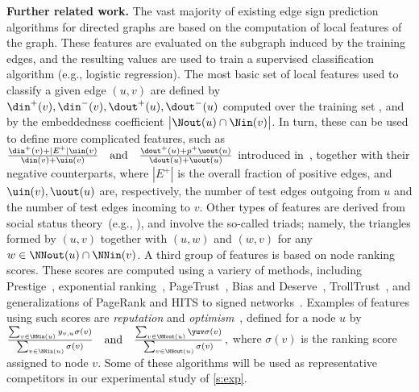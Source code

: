 \label{ssec:further_related}
{\bf Further related work.} The vast majority of existing edge sign prediction algorithms for
directed graphs are based on the computation of local features of the graph. These features are
evaluated on the subgraph induced by the training edges, and the resulting values are used to train
a supervised classification algorithm (e.g., logistic regression). The most basic set of local
features used to classify a given edge $(u,v)$ are defined by
$\din^+(v),\din^-(v),\dout^+(u),\dout^-(u)$ computed over the training set \trainset{}, and by the
embeddedness coefficient $\big|\Nout(u) \cap \Nin(v)\big|$. In turn, these can be used to define
more complicated features, such as
\(
	\frac{\din^+(v) + |E^+|\uin(v)}{\din(v) + \uin(v)}
\quad\text{and}\quad
	\frac{\dout^+(u) + p^+\uout(u)}{\dout(u) + \uout(u)}
\)
introduced in~\autocite{Bayesian15}, together with their negative counterparts, where $|E^+|$ is the
overall fraction of positive edges, and $\uin(v),\uout(u)$ are, respectively, the number of test
edges outgoing from $u$ and the number of test edges incoming to $v$.
Other types of features are derived from social status theory~(e.g., \autocite{Leskovec2010}), and
involve the so-called triads; namely, the triangles formed by $(u,v)$ together with $(u,w)$ and
$(w,v)$ for any $w \in \NNout(u) \cap \NNin(v)$. A third group of features is based on node ranking
scores. These scores are computed using a variery of methods, including
Prestige~\autocite{zolfaghar2010mining}, exponential ranking~\autocite{traag2010exponential},
PageTrust~\autocite{de2008pagetrust}, Bias and Deserve~\autocite{mishra2011finding},
TrollTrust~\autocite{wu2016troll}, and generalizations of PageRank and HITS to signed
networks~\autocite{shahriari2014ranking}. Examples of features using such scores are \textsl{reputation}
and \textsl{optimism}~\autocite{shahriari2014ranking}, defined for a node $u$ by
\(
	\frac{\sum_{v \in \NNin(u)} y_{v,u}\sigma(v)}{\sum_{v \in \NNin(u)} \sigma(v)}
\quad\text{and}\quad
	\frac{\sum_{v \in \NNout(u)} \yuv\sigma(v)}{\sum_{v \in \NNout(u)} \sigma(v)}\,,
\)
where $\sigma(v)$ is the ranking score assigned to node $v$. Some of these algorithms will be used
as representative competitors in our experimental study of \autoref{s:exp}.
